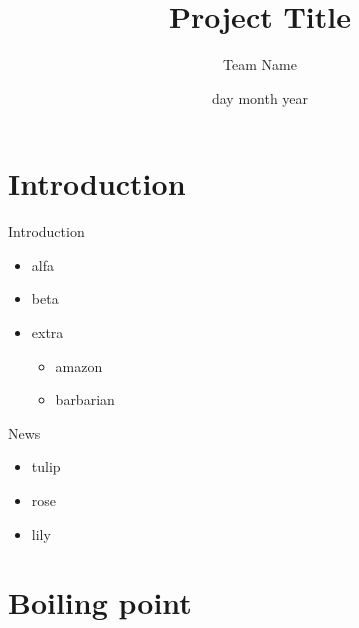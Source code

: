 \documentclass{soa.cs.pub.ro}
\title[Project Title Abbreviation]{Project Title}
\subtitle{Team Name}
\date{day month year}
\begin{document}
\frame{\titlepage}

\frame{\tableofcontents}

\section{Introduction}

\begin{frame}{Introduction}
  \begin{itemize}
    \item alfa
    \item beta
    \item extra
      \begin{itemize}
        \item amazon
        \item barbarian
      \end{itemize}
  \end{itemize}
\end{frame}

\begin{frame}{News}
  \begin{itemize}
    \item tulip
    \item rose
    \item lily
  \end{itemize}
\end{frame}

\section{Boiling point}
\end{document}
